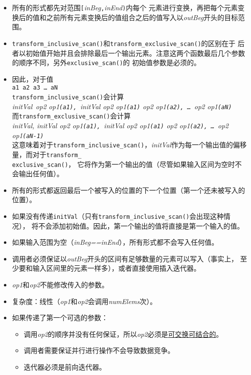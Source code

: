 \begin{itemize}
    \item 所有的形式都先对范围\texttt{[}\emph{inBeg}\texttt{,}\emph{inEnd}\texttt{)}内每个
    元素进行变换，再把每个元素变换后的值和之前所有元素变换后的值组合之后的值写入以\emph{outBeg}开头的目标范围。
    \item \texttt{transform\_inclusive\_scan()}和\texttt{transform\_exclusive\_scan()}的区别在于
    后者以初始值开始并且会排除最后一个输出元素。注意这两个函数最后几个参数的顺序不同，另外\texttt{exclusive\_scan()}的
    初始值参数是必须的。
    \item 因此，对于值\\
    \hspace*{2em}\texttt{a1 a2 a3 \ldots\ aN}\\
    \texttt{transform\_inclusive\_scan()}会计算\\
    \hspace*{2em}\emph{initVal\ op2  op1\texttt{(a1), }initVal op2 op1\texttt{(a1)} op2 op1\texttt{(a2), \ldots\ }op2 op1\texttt{(aN)}}\\
    而\texttt{transform\_exclusive\_scan()}会计算\\
    \hspace*{2em}\emph{initVal, initVal op2 op1\texttt{(a1), }initVal op2 op1\texttt{(a1)} op2 op1\texttt{(a2), \ldots\ }op2 op1\texttt{(aN-1)}}\\
    这意味着对于\texttt{transform\_inclusive\_scan()}，\emph{initVal}作为每一个输出值的偏移量，而对于\texttt{transform\_\\
    exclusive\_scan()}，
    它将作为第一个输出的值（尽管如果输入区间为空时不会输出任何值）。
    \item 所有的形式都返回最后一个被写入的位置的下一个位置（第一个还未被写入的位置）。
    \item 如果没有传递\texttt{initVal}（只有\texttt{transform\_inclusive\_scan()}会出现这种情况），
    将不会添加初始值。因此，第一个输出的值将直接是第一个输入的值。
    \item 如果输入范围为空（\emph{inBeg==inEnd}），所有形式都不会写入任何值。
    \item 调用者必须保证以\emph{outBeg}开头的区间有足够数量的元素可以写入（事实上，
    至少要和输入区间里的元素一样多），或者直接使用插入迭代器。
    \item \emph{op1}和\emph{op2}不能修改传入的参数。
    \item 复杂度：线性（\emph{op1}和\emph{op2}会调用\emph{numElems}次）。
    \item 如果传递了第一个可选的参数：
    \begin{itemize}
        \item 调用\emph{op2}的顺序并没有任何保证，所以\emph{op2}必须是\hyperref[ch22.6.1.1]{可交换可结合的}。
        \item 调用者需要保证并行进行操作不会导致数据竞争。
        \item 迭代器必须是前向迭代器。
    \end{itemize}
\end{itemize}
